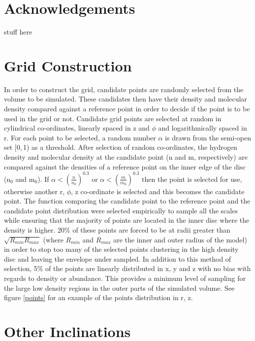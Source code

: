 \documentclass[useAMS,usenatbib]{mn2e}
\begin{document}
\section*{Acknowledgements}

stuff here
\newpage

\appendix

\section{Grid Construction} \label{sec:gridding} 

In order to construct the grid, candidate points are randomly selected from the volume to be simulated. These candidates then have their density and molecular density compared against a reference point in order to decide if the point is to be used in the grid or not. Candidate grid points are selected at random in cylindrical co-ordinates, linearly spaced in z and $\phi$ and logarithmically spaced in r. For each point to be selected, a random number $\alpha$ is drawn from the semi-open set [0,$\,$1) as a threshold. After selection of random co-ordinates, the hydrogen density and molecular density at the candidate point (n and m, respectively) are compared against the densities of a reference point on the inner edge of the disc (n$_0$ and m$_0$). If $\alpha<\left( \frac{n}{n_0} \right)^{0.3}$ or $\alpha< \left( \frac{m}{m_0} \right)^{0.3}$ then the point is selected for use, otherwise another r, $\phi$, z co-ordinate is selected and this becomes the candidate point. The function comparing the candidate point to the reference point and the candidate point distribution were selected empirically to sample all the scales while ensuring that the majority of points are located in the inner disc where the density is higher. 20\% of these points are forced to be at radii greater than $\sqrt{R_{min}R_{max}}$ (where $R_{min}$ and $R_{max}$ are the inner and outer radius of the model) in order to stop too many of the selected points clustering in the high density disc and leaving the envelope under sampled. In addition to this method of selection, 5\% of the points are linearly distributed in x, y and z with no bias with regards to density or abundance. This provides a minimum level of sampling for the large low density regions in the outer parts of the simulated volume. See figure \ref{points} for an example of the points distribution in r, z. \newline


\section[]{Other Inclinations}
\end{document}
